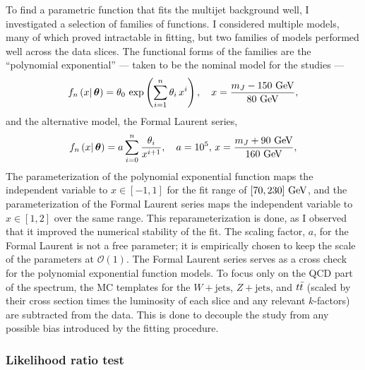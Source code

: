 To find a parametric function that fits the multijet background well, I investigated a selection of families of functions.
I considered multiple models, many of which proved intractable in fitting, but two families of models performed well across the \CRQCD{} data slices.
The functional forms of the families are the ``polynomial exponential'' --- taken to be the nominal model for the studies ---
\begin{equation}
 f_{n} \left(x \middle|\,\boldsymbol{\theta}\right) = \theta_{0}\, \exp\left(\sum_{i=1}^{n} \theta_{i}\,x^{i}\right), \quad x = \frac{m_{J} - 150~\mathrm{GeV}}{80~\mathrm{GeV}},
 \label{eq:poly_exp}
\end{equation}
and the alternative model, the Formal Laurent series,
\begin{equation}
 f_{n} \left(x \middle|\,\boldsymbol{\theta}\right) = a \sum_{i=0}^{n} \frac{\theta_{i}}{x^{i+1}}, \quad a=10^{5},\,x = \frac{m_{J} + 90~\mathrm{GeV}}{160~\mathrm{GeV}},
 \label{eq:formal_laurent}
\end{equation}
The parameterization of the polynomial exponential function maps the independent variable to $x \in \left[-1,1\right]$ for the fit range of $[70,230]~\mathrm{GeV}$, and the parameterization of the Formal Laurent series maps the independent variable to $x \in \left[1,2\right]$ over the same range.
This reparameterization is done, as I observed that it improved the numerical stability of the fit.
The scaling factor, $a$, for the Formal Laurent is not a free parameter; it is empirically chosen to keep the scale of the parameters at $\mathcal{O}(1)$.
The Formal Laurent series serves as a cross check for the polynomial exponential function models.
To focus only on the QCD part of the spectrum, the MC templates for the $W+\mathrm{jets}$, $Z+\mathrm{jets}$, and $t\bar{t}$ (scaled by their cross section times the luminosity of each slice and any relevant $k$-factors) are subtracted from the data.
This is done to decouple the study from any possible bias introduced by the fitting procedure.

\clearpage
\subsubsection{Likelihood ratio test}

